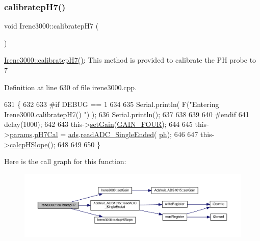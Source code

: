 \subsubsection{\texorpdfstring{calibratep\+H7()}{calibratepH7()}}
{\footnotesize\ttfamily void Irene3000\+::calibratep\+H7 (\begin{DoxyParamCaption}{ }\end{DoxyParamCaption})}

\hyperlink{class_irene3000_a1d3299202e4cb7afcff9c9e3e95d94c1}{Irene3000\+::calibratep\+H7()}\+: This method is provided to calibrate the PH probe to 7 

Definition at line 630 of file irene3000.\+cpp.


\begin{DoxyCode}
631 \{
632 
633 \textcolor{preprocessor}{#if DEBUG == 1 }
634 
635     Serial.println( F(\textcolor{stringliteral}{"Entering Irene3000.calibratepH7() "}) );
636     Serial.println();
637     
638     
639 
640 \textcolor{preprocessor}{#endif }
641     delay(1000);
642 
643     this->\hyperlink{class_irene3000_aff7c5da186b388e7272e63ff88a20c34}{setGain}(\hyperlink{_cool_adafruit___a_d_s1015_8h_a3d6c0e15829a207b9155890811fa4781a33fa5521f4e806b7438052fcdbbf8660}{GAIN\_FOUR});
644         
645     this->\hyperlink{class_irene3000_a136585a5ee7f9ac6ab52175fa153f8e3}{params}.\hyperlink{struct_irene3000_1_1parameters___t_a21265466a570d84bff914f26d2f7a03e}{pH7Cal} = \hyperlink{class_irene3000_a1215e77ba761c9908d80d691f149e135}{ads}.\hyperlink{class_adafruit___a_d_s1015_a40f38b9e1f3ec397c0670dd632510235}{readADC\_SingleEnded}(
      \hyperlink{_irene3000_8h_af771ceafe0e6524dd8497d4305dfe778}{ph});
646  
647     this->\hyperlink{class_irene3000_a81f6a79e546679692053f7ac1af49613}{calcpHSlope}();
648 
649 
650 \}
\end{DoxyCode}
Here is the call graph for this function\+:\nopagebreak
\begin{figure}[H]
\begin{center}
\leavevmode
\includegraphics[width=350pt]{d6/d03/class_irene3000_a1d3299202e4cb7afcff9c9e3e95d94c1_cgraph}
\end{center}
\end{figure}
